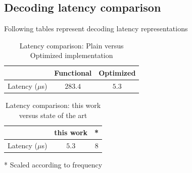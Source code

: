 %

\subsection{Decoding latency comparison}
Following tables represent decoding latency representations
\begin{table}[!h]
	\begin{center}
		\caption{Latency comparison: Plain versus Optimized implementation}
		\label{tab:decoderLatency}
		\begin{tabular}{c|c|c} %
			\textbf{ } & Functional & Optimized \\
			\hline
			Latency ($\mu$s) & $283.4$ & $5.3$\\
		\end{tabular}
	\end{center}
\end{table}

\begin{table}[!h]
		\begin{center}
		\caption{Latency comparison: this work versus state of the art \cite{lowLatencySWPolarDec}}
		\label{tab:decoderLatencyStateofTheART}
		\begin{threeparttable}
		\begin{tabular}{c|c|c} %
			\textbf{ } & this work & \cite{lowLatencySWPolarDec}* \\
			\hline
			Latency ($\mu$s) & $5.3$ & $8$\\
			\hline
		\end{tabular}
	\begin{tablenotes}\footnotesize
		\item[*] Scaled according to frequency
	\end{tablenotes}
	\end{threeparttable}
	\end{center}
\end{table}

